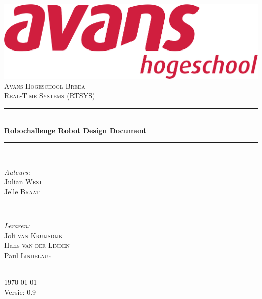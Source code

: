 \documentclass[12pt]{article} %
\begin{document}
\begin{titlepage}
\newcommand{\HRule}{\rule{\linewidth}{0.5mm}} %

\center %
\includegraphics[scale=.1,keepaspectratio]{avans.pdf} \\
\textsc{\Large Avans Hogeschool Breda}\\[0.5cm] %
\textsc{\large Real-Time Systems (RTSYS)}\\[0.5cm] %
\HRule \\[0.4cm]
{ \huge \bfseries Robochallenge Robot Design Document}\\[0.4cm] %
\HRule \\[1.5cm]

\begin{minipage}{0.4\textwidth}
\begin{flushleft} \large
\emph{Auteurs:}\\
Julian \textsc{West} \\
Jelle \textsc{Braat} \\
\end{flushleft}
\end{minipage}
~
\begin{minipage}{0.4\textwidth}
\begin{flushright} \large
\emph{Leraren:} \\
Joli \textsc{van Kruijsdijk} \\ %
Hans \textsc{van der Linden} \\
Paul \textsc{Lindelauf} %
\end{flushright}
\end{minipage}\\[4cm]

{\large \today}\\[3cm] %
Versie: 0.9
\vfill %

\end{titlepage}
\end{document}
